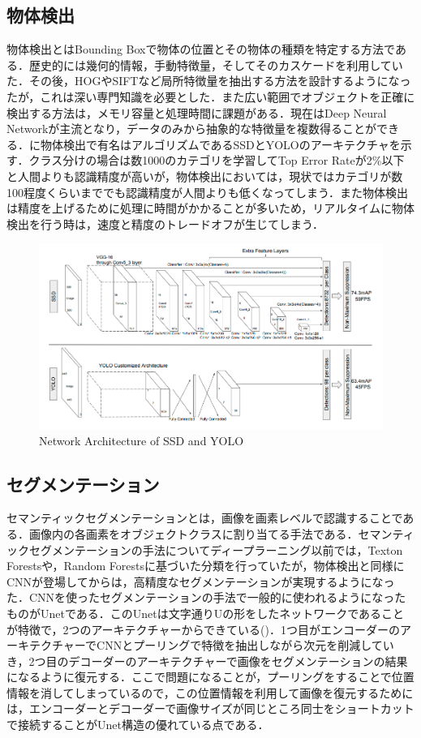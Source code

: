 \subsection*{物体検出}
物体検出とはBounding Boxで物体の位置とその物体の種類を特定する方法である．歴史的には幾何的情報，手動特徴量，そしてそのカスケードを利用していた．その後，HOG\cite{HOG}やSIFT\cite{SIFT}など局所特徴量を抽出する方法を設計するようになったが，これは深い専門知識を必要とした．また広い範囲でオブジェクトを正確に検出する方法は，メモリ容量と処理時間に課題がある．現在はDeep Neural Networkが主流となり，データのみから抽象的な特徴量を複数得ることができる．に物体検出で有名はアルゴリズムであるSSD\cite{SSD}とYOLO\cite{YOLOv3}のアーキテクチャを示す．クラス分けの場合は数1000のカテゴリを学習してTop Error Rateが2\%以下と人間よりも認識精度が高いが，物体検出においては，現状ではカテゴリが数100程度くらいまででも認識精度が人間よりも低くなってしまう．また物体検出は精度を上げるために処理に時間がかかることが多いため，リアルタイムに物体検出を行う時は，速度と精度のトレードオフが生じてしまう．

\begin{figure}[H]
	\centering
	\includegraphics[width=0.7\linewidth]{fig/yolo_ssd.png}
	\caption{Network Architecture of SSD and YOLO\cite{SSD}}
	\label{fig:SSD}
\end{figure}

\subsection*{セグメンテーション}
セマンティックセグメンテーションとは，画像を画素レベルで認識することである．画像内の各画素をオブジェクトクラスに割り当てる手法である．セマンティックセグメンテーションの手法についてディープラーニング以前では，Texton Forests\cite{shotton2008semantic}や，Random Forests\cite{kontschieder2011structured}に基づいた分類を行っていたが，物体検出と同様にCNNが登場してからは，高精度なセグメンテーションが実現するようになった．CNNを使ったセグメンテーションの手法で一般的に使われるようになったものがUnetである\cite{Unet}．このUnetは文字通りUの形をしたネットワークであることが特徴で，2つのアーキテクチャーからできている()．1つ目がエンコーダーのアーキテクチャーでCNNとプーリングで特徴を抽出しながら次元を削減していき，2つ目のデコーダーのアーキテクチャーで画像をセグメンテーションの結果になるように復元する．ここで問題になることが，プーリングをすることで位置情報を消してしまっているので，この位置情報を利用して画像を復元するためには，エンコーダーとデコーダーで画像サイズが同じところ同士をショートカットで接続することがUnet構造の優れている点である．

